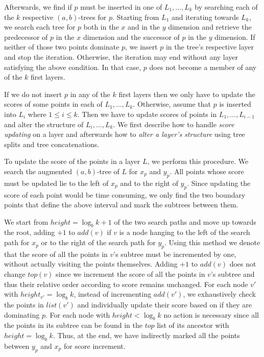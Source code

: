 \documentclass{llncs}
\begin{document}
Afterwards, we find if $p$ must be inserted in one of $L_1, \ldots, L_k$ by searching each of the $k$ respective $(a,b)$-trees for $p$. Starting from $L_1$ and iterating towards $L_k$, we search each tree for $p$ both in the $x$ and in the $y$ dimension and retrieve the predecessor of $p$ in the $x$ dimension and the successor of $p$ in the $y$ dimension. If neither of those two points dominate $p$, we insert $p$ in the tree's respective layer and stop the iteration. Otherwise, the iteration may end without any layer satisfying the above condition. In that case, $p$ does not become a member of any of the $k$ first layers.

If we do not insert $p$ in any of the $k$ first layers then we only have to update the scores of some points in each of $L_1, \ldots, L_k$. Otherwise, assume that $p$ is inserted into $L_i$ where $1 \leq i \leq k$. Then we have to update scores of points in $L_1, \ldots, L_{i-1}$ and alter the structure of $L_i, \ldots, L_k$. We first describe how to handle \emph{score updating} on a layer and afterwards how to \emph{alter a layer's structure} using tree splits and tree concatenations.


To update the score of the points in a layer $L$, we perform this procedure. We search the augmented $(a,b)$-tree of $L$ for $x_p$ and $y_p$. All points whose score must be updated lie to the left of $x_p$ and to the right of $y_p$. Since updating the score of each point would be time consuming, we only find the two boundary points that define the above interval and mark the subtrees between them.

We start from $height = \log_{b}k + 1$ of the two search paths and move up towards the root, adding $+1$ to $add(v)$ if $v$ is a node hanging to the left of the search path for $x_p$ or to the right of the search path for $y_p$. Using this method we denote that the score of all the points in $v$'s subtree must be incremented by one, without actually visiting the points themselves. Adding $+1$ to $add(v)$ does not change $top(v)$ since we increment the score of all the points in $v$'s subtree and thus their relative order according to score remains unchanged. For each node $v'$ with $height_{v'} = \log_{b}k$, instead of incrementing $add(v')$, we exhaustively check the points in $list(v')$ and individually update their score based on if they are dominating $p$. For each node with $height < \log_{b}k$ no action is necessary since all the points in its subtree can be found in the $top$ list of its ancestor with $height = \log_{b}k$. Thus, at the end, we have indirectly marked all the points between $y_p$ and $x_p$ for score increment.
\end{document}
